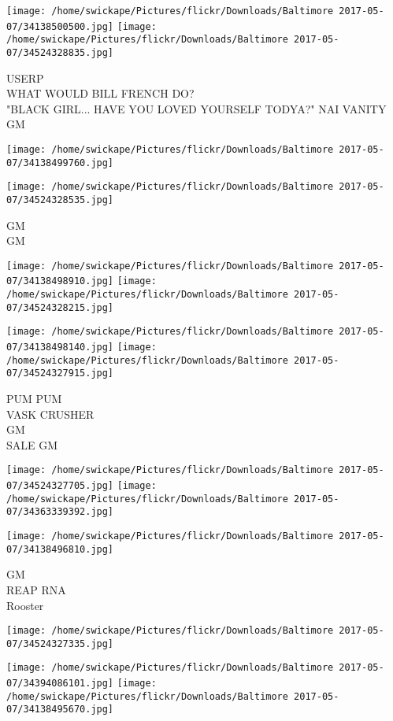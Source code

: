 \documentclass[10pt,letterpaper]{article}
\begin{document}
\texttt{[image: /home/swickape/Pictures/flickr/Downloads/Baltimore 2017-05-07/34138500500.jpg]}
\texttt{[image: /home/swickape/Pictures/flickr/Downloads/Baltimore 2017-05-07/34524328835.jpg]}

USERP\\
WHAT WOULD BILL FRENCH DO?\\
"BLACK GIRL... HAVE YOU LOVED YOURSELF TODYA?"  NAI VANITY\\
GM
\pagebreak

\texttt{[image: /home/swickape/Pictures/flickr/Downloads/Baltimore 2017-05-07/34138499760.jpg]}

\vspace{0.25in}
\texttt{[image: /home/swickape/Pictures/flickr/Downloads/Baltimore 2017-05-07/34524328535.jpg]}

GM\\
GM
\pagebreak

\texttt{[image: /home/swickape/Pictures/flickr/Downloads/Baltimore 2017-05-07/34138498910.jpg]}
\texttt{[image: /home/swickape/Pictures/flickr/Downloads/Baltimore 2017-05-07/34524328215.jpg]}

\texttt{[image: /home/swickape/Pictures/flickr/Downloads/Baltimore 2017-05-07/34138498140.jpg]}
\texttt{[image: /home/swickape/Pictures/flickr/Downloads/Baltimore 2017-05-07/34524327915.jpg]}

PUM PUM\\
VASK CRUSHER\\
GM\\
SALE GM
\pagebreak

\texttt{[image: /home/swickape/Pictures/flickr/Downloads/Baltimore 2017-05-07/34524327705.jpg]}
\texttt{[image: /home/swickape/Pictures/flickr/Downloads/Baltimore 2017-05-07/34363339392.jpg]}

\texttt{[image: /home/swickape/Pictures/flickr/Downloads/Baltimore 2017-05-07/34138496810.jpg]}

GM\\
REAP RNA\\
Rooster
\pagebreak

\texttt{[image: /home/swickape/Pictures/flickr/Downloads/Baltimore 2017-05-07/34524327335.jpg]}

\vspace{0.25in}
\texttt{[image: /home/swickape/Pictures/flickr/Downloads/Baltimore 2017-05-07/34394086101.jpg]}
\texttt{[image: /home/swickape/Pictures/flickr/Downloads/Baltimore 2017-05-07/34138495670.jpg]}
\end{document}
